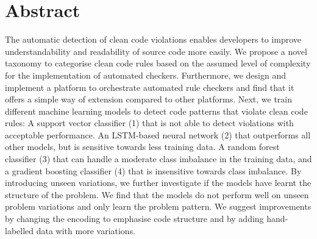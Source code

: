 \section*{Abstract}    
The automatic detection of clean code violations enables developers to improve understandability and readability of source code more easily. We propose a novel taxonomy to categorise clean code rules based on the assumed level of complexity for the implementation of automated checkers. Furthermore, we design and implement a platform to orchestrate automated rule checkers and find that it offers a simple way of extension compared to other platforms. Next, we train different machine learning models to detect code patterns that violate clean code rules: A support vector classifier (1) that is not able to detect violations with acceptable performance. An LSTM-based neural network (2) that outperforms all other models, but is sensitive towards less training data. A random forest classifier (3) that can handle a moderate class imbalance in the training data, and a gradient boosting classifier (4) that is insensitive towards class imbalance. By introducing unseen variations, we further investigate if the models have learnt the structure of the problem. We find that the models do not perform well on unseen problem variations and only learn the problem pattern. We suggest improvements by changing the encoding to emphasise code structure and by adding hand-labelled data with more variations.